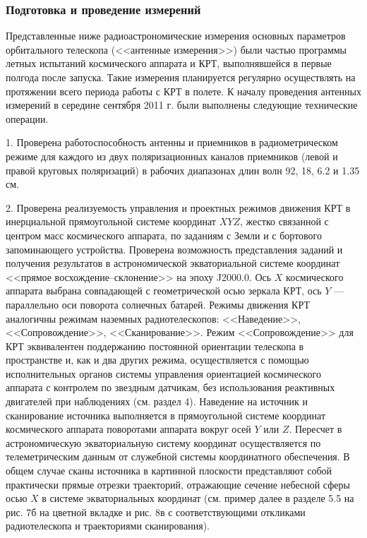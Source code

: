 \subsubsection{Подготовка и проведение измерений}


Представленные ниже радиоастрономические измерения основных параметров
орбитального телескопа (<<антенные измерения>>) были частью
программы летных испытаний космического аппарата и КРТ,
выполнявшейся в первые полгода после запуска.
Такие измерения планируется регулярно осуществлять на протяжении всего
периода работы с КРТ в полете. К началу проведения антенных измерений
в середине сентября 2011 г. были выполнены следующие технические
операции.

1. Проверена работоспособность антенны и
приемников в радиометрическом режиме для каждого
из двух поляризационных каналов приемников (левой и правой круговых поляризаций)
в рабочих диапазонах длин волн 92, 18, 6.2 и 1.35 см.

2. Проверена реализуемость управления и проектных режимов движения КРТ в
инерциальной прямоугольной системе координат $XYZ$, жестко связанной с центром масс
космического аппарата, по заданиям с Земли и с бортового запоминающего
устройства. Проверена возможность представления заданий и получения
результатов в астрономической экваториальной системе координат
<<прямое восхождение--склонение>> на эпоху J2000.0. Ось $X$
 космического
аппарата выбрана совпадающей с геометрической осью зеркала КРТ,
ось $Y$ --- параллельно оси поворота солнечных батарей.
Режимы движения КРТ аналогичны режимам наземных радиотелескопов:
<<Наведение>>, <<Сопровождение>>, <<Сканирование>>.
Режим <<Сопровождение>> для КРТ эквивалентен поддержанию постоянной ориентации
телескопа в пространстве и, как и два других режима, осуществляется
с помощью исполнительных органов системы управления ориентацией
космического аппарата с контролем по звездным датчикам,
без использования реактивных двигателей при наблюдениях (см. раздел 4).
Наведение на источник и сканирование источника выполняется в прямоугольной
системе координат космического аппарата поворотами аппарата вокруг осей $Y$ или $Z$.
Пересчет в астрономическую экваториальную систему координат
осуществляется по телеметрическим данным от служебной
системы координатного обеспечения.
В общем случае сканы источника в картинной плоскости представляют
собой практически прямые отрезки траекторий, отражающие сечение
небесной сферы осью $X$
в системе экваториальных координат
(см. пример далее в разделе 5.5 на рис.   7б на цветной вкладке и рис. 8в с соответствующими
откликами радиотелескопа и
траекториями сканирования).

